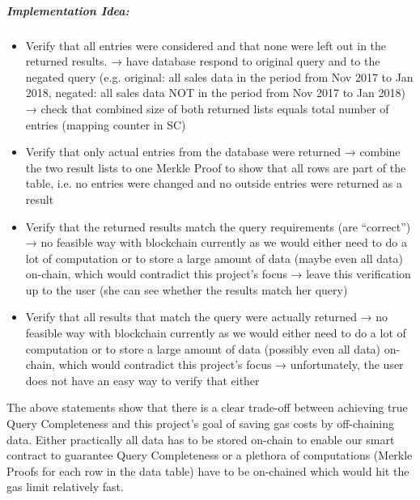 \subparagraph{Implementation Idea:}
\begin{itemize}
\item Verify that all entries were considered and that none were left out in the returned results.
→  have database respond to original query and to the negated query (e.g. original: all sales data in the period from Nov 2017 to Jan 2018, negated: all sales data NOT in the period from Nov 2017 to Jan 2018)
→ check that combined size of both returned lists equals total number of entries (mapping counter in SC)
\item Verify that only actual entries from the database were returned
→ combine the two result lists to one Merkle Proof to show that all rows are part of the table, i.e. no entries were changed and no outside entries were returned as a result
\item Verify that the returned results match the query requirements (are “correct”)
→ no feasible way with blockchain currently as we would either need to do a lot of computation or to store a large amount of data (maybe even all data) on-chain, which would contradict this project’s focus
→ leave this verification up to the user (she can see whether the results match her query)
\item Verify that all results that match the query were actually returned
→ no feasible way with blockchain currently as we would either need to do a lot of computation or to store a large amount of data (possibly even all data) on-chain, which would contradict this project’s focus
→ unfortunately, the user does not have an easy way to verify that either
\end{itemize}
The above statements show that there is a clear trade-off between achieving true Query Completeness and this project’s goal of saving gas costs by off-chaining data. Either practically all data has to be stored on-chain to enable our smart contract to guarantee Query Completeness or a plethora of computations (Merkle Proofs for each row in the data table) have to be on-chained which would hit the gas limit relatively fast.

